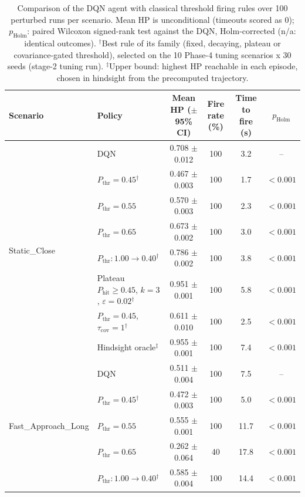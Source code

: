 \begin{table}[htbp]
\centering
\caption{Comparison of the DQN agent with classical threshold firing rules over 100 perturbed runs per scenario. Mean HP is unconditional (timeouts scored as 0); $p_{\mathrm{Holm}}$: paired Wilcoxon signed-rank test against the DQN, Holm-corrected (n/a: identical outcomes). $^{\dagger}$Best rule of its family (fixed, decaying, plateau or covariance-gated threshold), selected on the 10 Phase-4 tuning scenarios x 30 seeds (stage-2 tuning run). $^{\ddagger}$Upper bound: highest HP reachable in each episode, chosen in hindsight from the precomputed trajectory.}
\label{tab:comparison-traditional-rl}
\small
\begin{tabular}{llcccc}
\toprule
\textbf{Scenario} & \textbf{Policy} & \textbf{Mean HP ($\pm$95\% CI)} & \textbf{Fire rate (\%)} & \textbf{Time to fire (s)} & $p_{\mathrm{Holm}}$ \\
\midrule
\multirow{8}{*}{Static\_Close} & DQN & 0.708 $\pm$ 0.012 & 100 & 3.2 & -- \\
 & $P_{\mathrm{thr}}=0.45$$^{\dagger}$ & 0.467 $\pm$ 0.003 & 100 & 1.7 & $<0.001$ \\
 & $P_{\mathrm{thr}}=0.55$ & 0.570 $\pm$ 0.003 & 100 & 2.3 & $<0.001$ \\
 & $P_{\mathrm{thr}}=0.65$ & 0.673 $\pm$ 0.002 & 100 & 3.0 & $<0.001$ \\
 & $P_{\mathrm{thr}}: 1.00 \to 0.40$$^{\dagger}$ & 0.786 $\pm$ 0.002 & 100 & 3.8 & $<0.001$ \\
 & Plateau $P_{\mathrm{hit}}\geq0.45$, $k=3$, $\varepsilon=0.02$$^{\dagger}$ & 0.951 $\pm$ 0.001 & 100 & 5.8 & $<0.001$ \\
 & $P_{\mathrm{thr}}=0.45$, $\tau_{\mathrm{cov}}=1$$^{\dagger}$ & 0.611 $\pm$ 0.010 & 100 & 2.5 & $<0.001$ \\
 & Hindsight oracle$^{\ddagger}$ & 0.955 $\pm$ 0.001 & 100 & 7.4 & $<0.001$ \\
\midrule
\multirow{8}{*}{Fast\_Approach\_Long} & DQN & 0.511 $\pm$ 0.004 & 100 & 7.5 & -- \\
 & $P_{\mathrm{thr}}=0.45$$^{\dagger}$ & 0.472 $\pm$ 0.003 & 100 & 5.0 & $<0.001$ \\
 & $P_{\mathrm{thr}}=0.55$ & 0.555 $\pm$ 0.001 & 100 & 11.7 & $<0.001$ \\
 & $P_{\mathrm{thr}}=0.65$ & 0.262 $\pm$ 0.064 & 40 & 17.8 & $<0.001$ \\
 & $P_{\mathrm{thr}}: 1.00 \to 0.40$$^{\dagger}$ & 0.585 $\pm$ 0.004 & 100 & 14.4 & $<0.001$ \\

\end{tabular}
\end{table}
